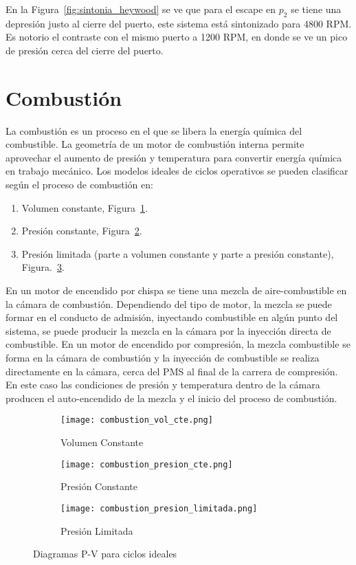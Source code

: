 En la Figura~\ref{fig:sintonia_heywood} se ve que para el escape en $p_2$ se
tiene una depresión justo al cierre del puerto, este sistema está sintonizado
para 4800 RPM.
%
Es notorio el contraste con el mismo puerto a 1200 RPM, en donde se ve un pico de
presión cerca del cierre del puerto.
%

\section{Combustión}
%
La combustión es un proceso en el que se libera la energía química del
combustible.
%
La geometría de un motor de combustión interna permite aprovechar
el aumento de presión y temperatura para convertir energía química en trabajo
mecánico.
%
Los modelos ideales de ciclos operativos se pueden clasificar según el proceso
de combustión en:
%
\begin{enumerate}
    \item Volumen constante, Figura~\ref{fig:comb_vcte}.
    \item Presión constante, Figura~\ref{fig:comb_pcte}.
    \item Presión limitada (parte a volumen constante y parte a presión
constante), Figura.~\ref{fig:comb_plim}.
\end{enumerate}

En un motor de encendido por chispa se tiene una mezcla de aire-combustible en
la cámara de combustión.
%
Dependiendo del tipo de motor, la mezcla se puede formar en el conducto de
admisión, inyectando combustible en algún punto del sistema, se puede producir
la mezcla en la cámara por la inyección directa de combustible.
%
En un motor de encendido por compresión, la mezcla combustible se forma en la
cámara de combustión y la inyección de combustible se realiza directamente en la
cámara, cerca del PMS al final de la carrera de compresión.
%
En este caso las condiciones de presión y temperatura dentro de la cámara producen el
auto-encendido de la mezcla y el inicio del proceso de combustión.

\begin{figure}[ht]
  \centering
  \begin{subfigure}{0.3\textwidth}
    \centering
    \texttt{[image: combustion\_vol\_cte.png]}
    \caption{Volumen Constante}\label{fig:comb_vcte}
  \end{subfigure}%
  \begin{subfigure}{0.3\textwidth}
    \centering
    \texttt{[image: combustion\_presion\_cte.png]}
    \caption{Presión Constante}\label{fig:comb_pcte}
  \end{subfigure}%
  \begin{subfigure}{0.3\textwidth}
    \centering
    \texttt{[image: combustion\_presion\_limitada.png]}
    \caption{Presión Limitada}\label{fig:comb_plim}
  \end{subfigure}
  \caption{Diagramas P-V para ciclos ideales\parencite{heywood}}\label{fig:ciclos_ideales}
\end{figure}

